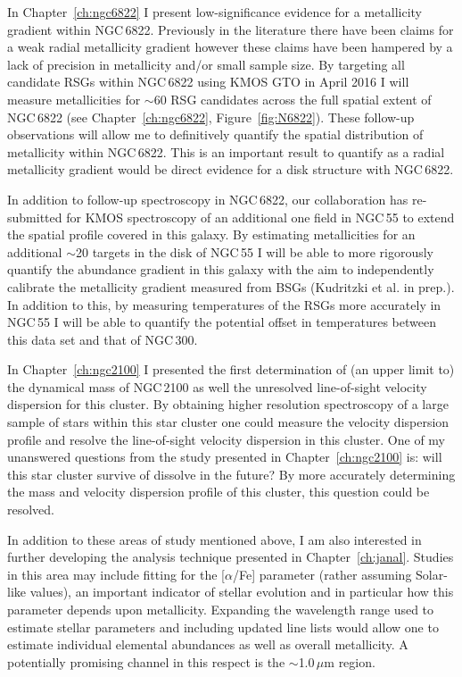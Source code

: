 In Chapter~\ref{ch:ngc6822} I present low-significance evidence for a metallicity gradient within NGC\,6822. Previously in the literature there have been claims for a weak radial metallicity gradient however these claims have been hampered by a lack of precision in metallicity and/or small sample size.
By targeting all candidate RSGs within NGC\,6822 using KMOS GTO in April 2016 I will measure metallicities for $\sim$60 RSG candidates across the full spatial extent of NGC\,6822 (see Chapter~\ref{ch:ngc6822}, Figure~\ref{fig:N6822}).
These follow-up observations will allow me to definitively quantify the spatial distribution of metallicity within NGC\,6822.
This is an important result to quantify as a radial metallicity gradient would be direct evidence for a disk structure with NGC\,6822.

In addition to follow-up spectroscopy in NGC\,6822, our collaboration has re-submitted for KMOS spectroscopy of an additional one field in NGC\,55 to extend the spatial profile covered in this galaxy.
By estimating metallicities for an additional $\sim$20 targets in the disk of NGC\,55 I will be able to more rigorously quantify the abundance gradient in this galaxy with the aim to independently calibrate the metallicity gradient measured from BSGs (Kudritzki et al. in prep.).
In addition to this, by measuring temperatures of the RSGs more accurately in NGC\,55 I will be able to quantify the potential offset in temperatures between this data set and that of NGC\,300.

In Chapter~\ref{ch:ngc2100} I presented the first determination of (an upper limit to) the dynamical mass of NGC\,2100 as well the unresolved line-of-sight velocity dispersion for this cluster.
By obtaining higher resolution spectroscopy of a large sample of stars within this star cluster one could measure the velocity dispersion profile and resolve the line-of-sight velocity dispersion in this cluster.
One of my unanswered questions from the study presented in Chapter~\ref{ch:ngc2100} is: will this star cluster survive of dissolve in the future?
By more accurately determining the mass and velocity dispersion profile of this cluster, this question could be resolved.


In addition to these areas of study mentioned above, I am also interested in further developing the analysis technique presented in Chapter~\ref{ch:janal}.
Studies in this area may include fitting for the [$\alpha$/Fe] parameter (rather assuming Solar-like values), an important indicator of stellar evolution and in particular how this parameter depends upon metallicity.
Expanding the wavelength range used to estimate stellar parameters and including updated line lists would allow one to estimate individual elemental abundances as well as overall metallicity.
A potentially promising channel in this respect is the $\sim$1.0\,$\mu$m region.

